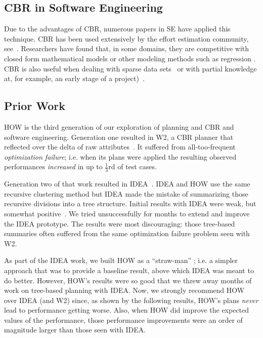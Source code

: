 \documentclass[conference]{IEEEtran}
\begin{document}
\subsection{CBR in Software Engineering}
Due to the advantages of CBR, numerous papers in SE
have applied this technique.    CBR  has been used extensively by the effort estimation community, see~\cite{keung2008analogy, 6600685, walkerden1999empirical, shepperd1997estimating, kocaguneli2010use}. 
Researchers have found that, in some domains, they are competitive with  closed form mathematical models or other modeling methods such as regression \cite{keung2008analogy}. 
CBR is also useful when dealing with sparse data sets~\cite{1438374} or with 
partial knowledge  at, for example,  an early stage of a project)~\cite{walkerden1999empirical}. 

\subsection{Prior Work}

HOW is the third
generation of our exploration of  planning and CBR and software engineering.
Generation one  resulted in
 W2, a CBR planner that reflected over the delta of raw  attributes~\cite{6600685}. It suffered from all-too-frequent {\em optimization failure}; i.e. when its plans were applied the resulting observed
performances {\em increased} in up to $\frac{1}{3}$rd of test cases.

Generation two of that work resulted in  IDEA~\cite{me12c}.
IDEA and HOW use the    same recursive clustering
method but IDEA made the mistake of  summarizing those
recursive divisions into a tree structure. Initial results with IDEA were weak, but somewhat
positive~\cite{me12c}. We tried unsuccessfully for  months to extend and improve
the IDEA prototype. The results were most discouraging: those tree-based summaries often suffered
from the same optimization failure problem seen with W2. 

As part of the IDEA work, we built HOW as a ``straw-man'' ; i.e. a  simpler
approach that was  to provide a baseline result,  above which IDEA was meant
to do better.   However, HOW's results were so good that we  threw away months
of work on tree-based planning with IDEA. Now, we strongly recommend HOW
over IDEA (and W2) since, as shown by the following results, HOW's plans {\em never} lead to performance getting worse. Also, when HOW did improve the expected values of the performance,
those performance improvements were an order of magnitude larger than those seen
with IDEA.
\end{document}
